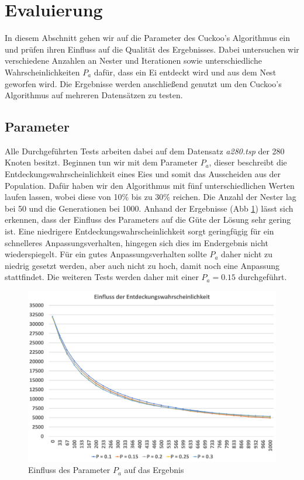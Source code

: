 \documentclass[conference]{IEEEtran}
\begin{document}
  \section{Evaluierung}
    In diesem Abschnitt gehen wir auf die Parameter des Cuckoo's Algorithmus ein und prüfen ihren Einfluss auf die Qualität des Ergebnisses.
    Dabei untersuchen wir verschiedene Anzahlen an Nester und Iterationen sowie unterschiedliche Wahrscheinlichkeiten $P_a$ dafür, dass ein Ei entdeckt wird 
    und aus dem Nest geworfen wird. Die Ergebnisse werden anschließend genutzt um den Cuckoo's Algorithmus auf mehreren 
    Datensätzen zu testen.


    \subsection{Parameter}
      Alle Durchgeführten Tests arbeiten dabei auf dem Datensatz \emph{a280.tsp} der 280 Knoten besitzt. 
      Beginnen tun wir mit dem Parameter $P_a$, dieser beschreibt die Entdeckungswahrscheinlichkeit eines Eies und somit das Ausscheiden aus der Population. 
      Dafür haben wir den Algorithmus mit fünf unterschiedlichen Werten laufen lassen, wobei diese von 10\% bis zu 30\% reichen. 
      Die Anzahl der Nester lag bei 50 und die Generationen bei 1000. 
      Anhand der Ergebnisse (Abb \ref{fig:pa}) lässt sich erkennen, dass der Einfluss des Parameters auf die Güte der Lösung sehr gering ist. Eine 
      niedrigere Entdeckungswahrscheinlichkeit sorgt geringfügig für ein schnelleres Anpassungsverhalten, hingegen sich dies im Endergebnis nicht wiederspiegelt. 
      Für ein gutes Anpassungsverhalten sollte $P_a$ daher nicht zu niedrig gesetzt werden, aber auch nicht zu hoch, damit noch eine Anpassung stattfindet. 
      Die weiteren Tests werden daher mit einer $P_a = 0.15$ durchgeführt.

      \begin{figure}[H]
        \centering
        \includegraphics[width=0.8\linewidth]{Entdeckungswahrscheinlichkeit.png}
        \caption{Einfluss des Parameter $P_a$ auf das Ergebnis}
        \label{fig:pa}
      \end{figure}
\end{document}

